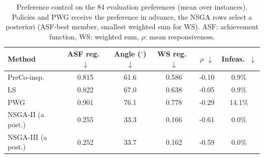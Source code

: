 \begin{table}[htbp]
\centering
\caption{Preference control on the 84 evaluation preferences (mean over instances). Policies and PWG receive the preference in advance, the NSGA rows select a posteriori (ASF-best member, smallest weighted sum for WS). ASF: achievement function, WS: weighted sum, $\rho$: mean responsiveness.}
\label{tab:pref}
\footnotesize
\setlength{\tabcolsep}{2.5pt}
\begin{tabular}{lccccc}
\toprule
Method & ASF reg.\ $\downarrow$ & Angle ($^\circ$) $\downarrow$ & WS reg.\ $\downarrow$ & $\rho$ $\downarrow$ & Infeas.\ $\downarrow$ \\
\midrule
PreCo-insp. & 0.815 & 61.6 & 0.586 & -0.10 & 0.9\% \\
LS & 0.822 & 67.0 & 0.638 & -0.05 & 0.9\% \\
PWG & 0.901 & 76.1 & 0.778 & -0.29 & 14.1\% \\
NSGA-II (a post.) & 0.255 & 33.3 & 0.166 & -0.61 & 0.0\% \\
NSGA-III (a post.) & 0.252 & 33.7 & 0.162 & -0.59 & 0.0\% \\
\bottomrule
\end{tabular}
\end{table}
